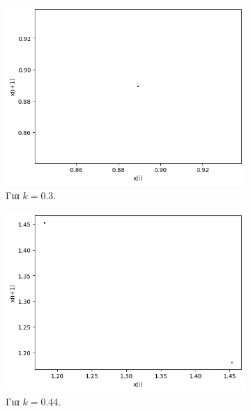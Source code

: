 \begin{figure}[h!]
	\centering	
	\begin{subfigure}[b]{0.4\textwidth}
		\centering
		\includegraphics[width=\textwidth]{LateX images/graphs q03/g3}
		\caption{Για $k=0.3$.}
		\label{f:k15}
	\end{subfigure}
	\hfill
	\begin{subfigure}[b]{0.4\textwidth}
		\centering
		\includegraphics[width=\textwidth]{LateX images/graphs q03/g4}
		\caption{Για $k=0.44$.}
		\label{f:k16}
	\end{subfigure}
	\hfill
	\begin{subfigure}[b]{0.4\textwidth}
		\centering

\end{subfigure}
\end{figure}
